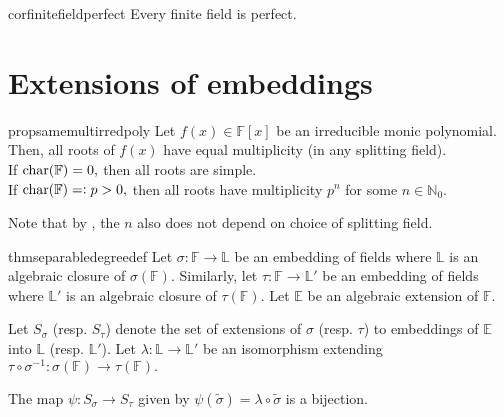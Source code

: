 \begin{restatable}[]{cor}{finitefieldperfect}
\label{cor:finitefieldperfect}
    Every finite field is perfect. \hfill\hyperref[cor:finitefieldperfect2]{\downsym}
\end{restatable}

\section{Extensions of embeddings}
\begin{restatable}[]{prop}{samemultirredpoly}
\label{prop:samemultirredpoly}
    Let $f(x) \in \mathbb{F}[x]$ be an irreducible monic polynomial. Then, all roots of $f(x)$ have equal multiplicity (in any splitting field). \\
    If $\operatorname{char}(\mathbb{F}) = 0,$ then all roots are simple. \\
    If $\operatorname{char}(\mathbb{F}) =\vcentcolon p > 0,$ then all roots have multiplicity $p^n$ for some $n \in \mathbb{N}_0.$ \hfill\hyperref[prop:samemultirredpoly2]{\downsym}
\end{restatable}
Note that by , the $n$ also does not depend on choice of splitting field.

\begin{restatable}[]{thm}{separabledegreedef}
\label{thm:separabledegreedef}
    Let $\sigma : \mathbb{F} \to \mathbb{L}$ be an embedding of fields where $\mathbb{L}$ is an algebraic closure of $\sigma(\mathbb{F}).$ Similarly, let $\tau : \mathbb{F} \to \mathbb{L}'$ be an embedding of fields where $\mathbb{L}'$ is an algebraic closure of $\tau(\mathbb{F}).$ Let $\mathbb{E}$ be an algebraic extension of $\mathbb{F}.$

    Let $S_\sigma$ (resp. $S_\tau$) denote the set of extensions of $\sigma$ (resp. $\tau$) to embeddings of $\mathbb{E}$ into $\mathbb{L}$ (resp. $\mathbb{L}'$). Let $\lambda : \mathbb{L} \to \mathbb{L}'$ be an isomorphism extending $\tau \circ \sigma^{-1} : \sigma(\mathbb{F}) \to \tau(\mathbb{F}).$  

    The map $\psi : S_\sigma \to S_\tau$ given by $\psi(\widetilde{\sigma}) = \lambda \circ \widetilde{\sigma}$ is a bijection. \hfill\hyperref[thm:separabledegreedef2]{\downsym}
\end{restatable}

